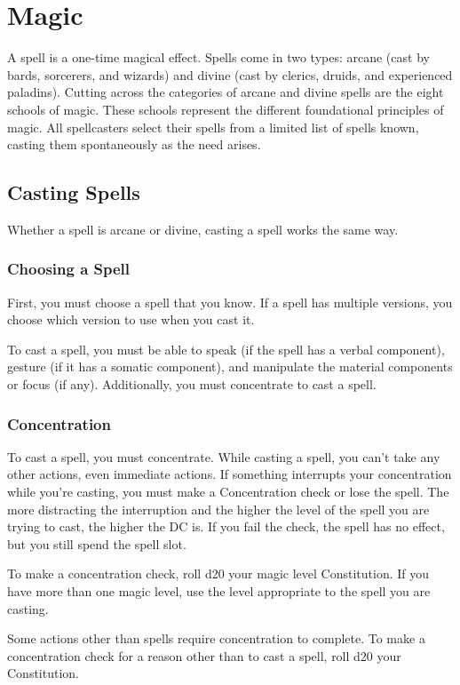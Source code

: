 \chapter{Magic}
A spell is a one-time magical effect. Spells come in two types: arcane (cast by bards, sorcerers, and wizards) and divine (cast by clerics, druids, and experienced paladins). Cutting across the categories of arcane and divine spells are the eight schools of magic. These schools represent the different foundational principles of magic. All spellcasters select their spells from a limited list of spells known, casting them spontaneously as the need arises.

\section{Casting Spells}
Whether a spell is arcane or divine, casting a spell works the same way.

\subsection{Choosing a Spell}
First, you must choose a spell that you know. If a spell has multiple versions, you choose which version to use when you cast it.

To cast a spell, you must be able to speak (if the spell has a verbal component), gesture (if it has a somatic component), and manipulate the material components or focus (if any). Additionally, you must concentrate to cast a spell.

\subsection{Concentration}
To cast a spell, you must concentrate. While casting a spell, you can't take any other actions, even immediate actions. If something interrupts your concentration while you're casting, you must make a Concentration check or lose the spell. The more distracting the interruption and the higher the level of the spell you are trying to cast, the higher the DC is. If you fail the check, the spell has no effect, but you still spend the spell slot.

To make a concentration check, roll d20 \add your magic level \add Constitution. If you have more than one magic level, use the level appropriate to the spell you are casting.

Some actions other than spells require concentration to complete. To make a concentration check for a reason other than to cast a spell, roll d20 \add your Constitution.

